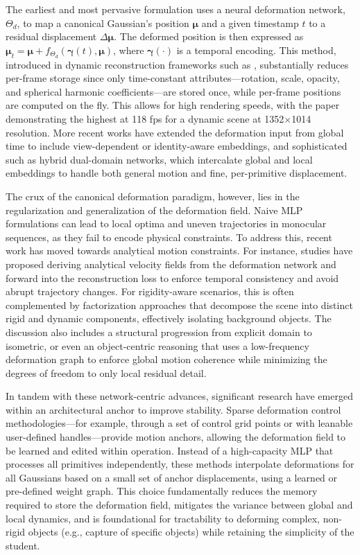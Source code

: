 \documentclass[11pt,a4paper]{article}
\begin{document}
The earliest and most pervasive formulation uses a neural deformation network, \(\Theta_d\), to map a canonical Gaussian's position \(\mathbf{\mu}\) and a given timestamp \(t\) to a residual displacement \(\Delta \mathbf{\mu}\). The deformed position is then expressed as \(\mathbf{\mu}_t = \mathbf{\mu} + f_{\Theta_d}(\mathbf{\gamma}(t), \mathbf{\mu})\), where \(\mathbf{\gamma}(\cdot)\) is a temporal encoding. This method, introduced in dynamic reconstruction frameworks such as \cite{arxiv:2311.12897v1}, substantially reduces per-frame storage since only time-constant attributes---rotation, scale, opacity, and spherical harmonic coefficients---are stored once, while per-frame positions are computed on the fly. This allows for high rendering speeds, with the paper demonstrating the highest at 118 fps for a dynamic scene at 1352$\times$1014 resolution. More recent works have extended the deformation input from global time to include view-dependent or identity-aware embeddings, and sophisticated such as hybrid dual-domain networks, which intercalate global and local embeddings to handle both general motion and fine, per-primitive displacement.

The crux of the canonical deformation paradigm, however, lies in the regularization and generalization of the deformation field. Naive MLP formulations can lead to local optima and uneven trajectories in monocular sequences, as they fail to encode physical constraints. To address this, recent work has moved towards analytical motion constraints. For instance, studies have proposed deriving analytical velocity fields from the deformation network and forward into the reconstruction loss to enforce temporal consistency and avoid abrupt trajectory changes. For rigidity-aware scenarios, this is often complemented by factorization approaches that decompose the scene into distinct rigid and dynamic components, effectively isolating background objects. The discussion also includes a structural progression from explicit domain to isometric, or even an object-centric reasoning that uses a low-frequency deformation graph to enforce global motion coherence while minimizing the degrees of freedom to only local residual detail.

In tandem with these network-centric advances, significant research have emerged within an architectural anchor to improve stability. Sparse deformation control methodologies---for example, through a set of control grid points or with leanable user-defined handles---provide motion anchors, allowing the deformation field to be learned and edited within operation. Instead of a high-capacity MLP that processes all primitives independently, these methods interpolate deformations for all Gaussians based on a small set of anchor displacements, using a learned or pre-defined weight graph. This choice fundamentally reduces the memory required to store the deformation field, mitigates the variance between global and local dynamics, and is foundational for tractability to deforming complex, non-rigid objects (e.g., capture of specific objects) while retaining the simplicity of the student.
\end{document}
